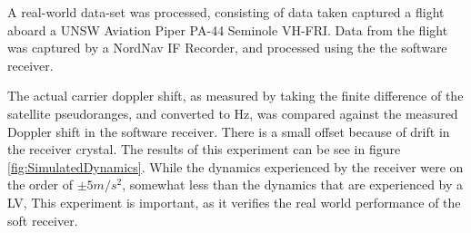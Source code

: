 A real-world data-set was processed, consisting of data taken captured a flight aboard a UNSW Aviation Piper PA-44 Seminole VH-FRI. Data from the flight was captured by a NordNav IF Recorder, and processed using the the software receiver. 

The actual carrier doppler shift, as measured by taking the finite difference of the satellite pseudoranges, and converted to Hz, was compared against the measured Doppler shift in the software receiver. There is a small offset because of drift in the receiver crystal. The results of this experiment can be see in figure \ref{fig:SimulatedDynamics}. While the dynamics experienced by the receiver were on the order of $\pm 5m/s^2$, somewhat less than the dynamics that are experienced by a \ac{LV}, This experiment is important, as it verifies the real world performance of the soft receiver. 


